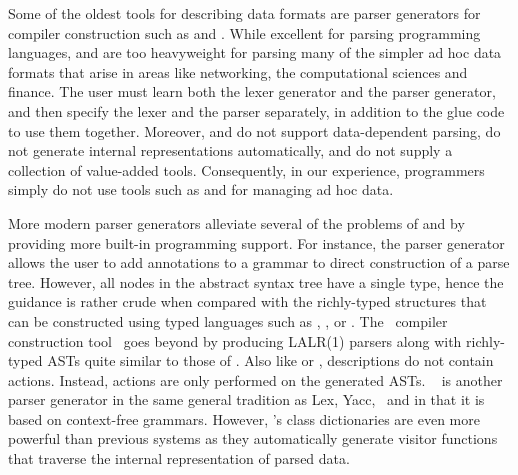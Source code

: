 Some of the oldest tools for describing data formats are parser
generators for compiler construction such as \lex{} and \yacc{}. While
excellent for parsing programming languages, \lex{} and \yacc{} are
too heavyweight for parsing many of the simpler ad hoc data formats
that arise in areas like networking, the computational sciences and
finance. The user must learn both the lexer generator and the parser
generator, and then specify the lexer and the parser separately, in
addition to the glue code to use them together.  Moreover, \lex{}
and \yacc{} do not support data-dependent parsing, do not generate
internal representations automatically, and do not supply a collection
of value-added tools.  Consequently, in our experience,
programmers simply do not use tools such as \lex{} and \yacc{}
for managing ad hoc data.

More modern parser generators alleviate several of the
problems of \lex{} and \yacc{} by providing more built-in programming
support.  For instance, the \antlr{} parser generator~\cite{antlr} allows
the user to add annotations to a grammar to direct construction of a
parse tree. However, all nodes in the abstract syntax tree have a 
single type, hence the guidance is rather crude when compared with
the richly-typed structures that can be constructed using
typed languages such as \padsc{}, \padsml{}, \datascript{} or \ddc. 
The \sablecc\ compiler construction
tool~\cite{sablecc} goes beyond
\antlr{} by producing LALR(1) parsers along with richly-typed ASTs
quite similar to those of \padsc{}. Also like \padsc{} or \padsml{}, 
descriptions
do not contain actions. Instead, actions are only performed on the
generated ASTs. \demeter{}~\cite{lieberherr+:class-dictionaries} is another parser
generator in the same general tradition as Lex, Yacc, \antlr\ and
\sablecc{} in that it is based on context-free grammars.  However,
\demeter{}'s class dictionaries are even more powerful than
previous systems as they
automatically generate visitor functions that traverse the internal
representation of parsed data.

